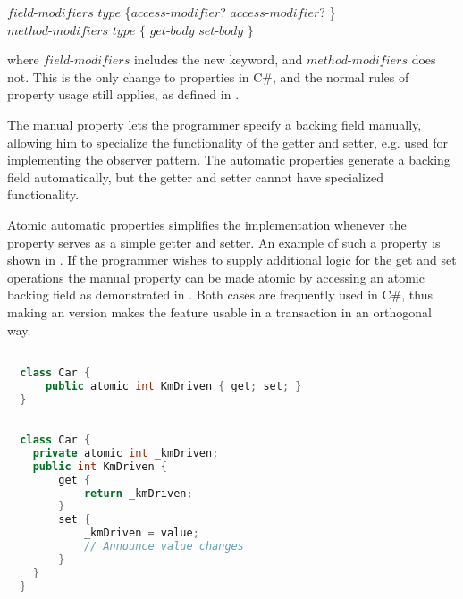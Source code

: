 $field$-$modifiers$ $type$  \{$access$-$modifier$? \bscode{;} $access$-$modifier$? \bscode{;} \}\\
$method$-$modifiers$ $type$  $\{$  $get$-$body$  $set$-$body$ $\}$

where $field$-$modifiers$ includes the new  keyword, and $method$-$modifiers$ does not. This is the only change to properties in C\#, and the normal rules of property usage still applies, as defined in \cite[p. 52]{sestoft2011c}.

The manual property lets the programmer specify a backing field manually, allowing him to specialize the functionality of the getter and setter, e.g. used for implementing the observer pattern. The automatic properties generate a backing field automatically, but the getter and setter cannot have specialized functionality. 

Atomic automatic properties simplifies the implementation whenever the property serves as a simple getter and setter. An example of such a property is shown in . If the programmer wishes to supply additional logic for the get and set operations the manual property can be made atomic by accessing an atomic backing field as demonstrated in . Both cases are frequently used in C\#, thus making an  version makes the feature usable in a transaction in an orthogonal way.

\begin{lstlisting}[label=lst:auto_atomic_property,
  caption={Automatic Transactional Properties},
  language=Java,  
  showspaces=false,
  showtabs=false,
  breaklines=true,
  showstringspaces=false,
  breakatwhitespace=true,
  commentstyle=\color{greencomments},
  keywordstyle=\color{bluekeywords},
  stringstyle=\color{redstrings},
  morekeywords={atomic, retry, orElse, var, get, set}]  % Start your code-block

  class Car {
      public atomic int KmDriven { get; set; }
  }
\end{lstlisting}

\begin{lstlisting}[label=lst:atomic_property,
  caption={Manual Transactional Property},
  language=Java,  
  showspaces=false,
  showtabs=false,
  breaklines=true,
  showstringspaces=false,
  breakatwhitespace=true,
  commentstyle=\color{greencomments},
  keywordstyle=\color{bluekeywords},
  stringstyle=\color{redstrings},
  morekeywords={atomic, retry, orElse, var, get, set}]  % Start your code-block

  class Car {
    private atomic int _kmDriven;
    public int KmDriven {
        get {
            return _kmDriven;
        }
        set {
            _kmDriven = value;
            // Announce value changes
        }
    }
  }
\end{lstlisting}


